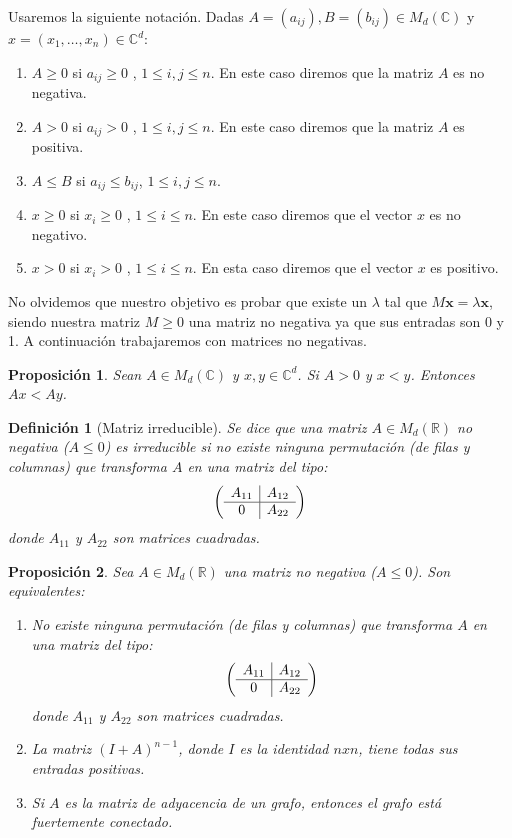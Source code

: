 \documentclass[size=a4, parskip=half, titlepage=false, toc=flat, toc=bib, 12pt]{scrartcl}
\theoremstyle{theorem-style}
\newtheorem{nprop}{Proposición}[section]
\theoremstyle{definition-style}
\newtheorem{ndef}{Definición}[section]
\theoremstyle{remark-style}
\theoremstyle{example-style}
\theoremstyle{definition-style}
\theoremstyle{remark-style}
\begin{document}
Usaremos la siguiente notación. Dadas $A = (a_{ij}),B = (b_{ij}) \in M_d(\mathbb{C})$ y $x = (x_1, \dots, x_n)\in \mathbb{C}^d$:
\begin{enumerate}
\item $A\geq 0$ si $a_{ij}\geq 0$ , $1 \leq i,j \leq n$. En este caso diremos que la matriz $A$ es no negativa.
\item $A > 0$ si $a_{ij} > 0$ , $1 \leq i, j \leq n$. En este caso diremos que la matriz $A$ es positiva.
\item $A \leq B$ si $a_{ij} \leq b_{ij}$, $1 \leq i,j \leq n$.
\item $x \geq 0$ si $x_i \geq 0$ , $1 \leq i \leq n$. En este caso diremos que el vector $x$ es no negativo.
\item $x > 0$ si $x_i > 0$ , $1 \leq i \leq n$. En esta caso diremos que el vector $x$ es positivo.
\end{enumerate}

No olvidemos que nuestro objetivo es probar que existe un $\lambda$ tal que $M\boldsymbol{x} = \lambda \boldsymbol{x}$, siendo nuestra matriz $M \geq 0$ una matriz no negativa ya que sus entradas son 0 y 1. A continuación trabajaremos con matrices no negativas.
\begin{nprop}
Sean $A \in M_d(\mathbb{C})$ y $x,y \in \mathbb{C}^d$. Si $A > 0$ y $x < y$. Entonces $Ax < Ay$.
\end{nprop}

\begin{ndef}[Matriz irreducible]
Se dice que una matriz $A \in M_d(\mathbb{R})$ no negativa ($A \leq 0$) es irreducible si no existe ninguna permutación (de filas y columnas) que transforma $A$ en una matriz del tipo:
$$\left(
      \begin{array}{{c|c}}
            A_{11}    &    A_{12}  \\\hline
            0         &    A_{22}     \\
      \end{array}   \right)$$
donde $A_{11}$ y $A_{22}$ son matrices cuadradas.
\end{ndef}
\begin{nprop} Sea $A \in M_d(\mathbb{R})$ una matriz no negativa ($A \leq 0$). Son equivalentes:
\begin{enumerate}
\item No existe ninguna permutación (de filas y columnas) que transforma $A$ en una matriz del tipo:
$$\left(
      \begin{array}{{c|c}}
            A_{11}    &    A_{12}  \\\hline
            0         &    A_{22}     \\
      \end{array}   \right)$$
donde $A_{11}$ y $A_{22}$ son matrices cuadradas.
\item La matriz $(I + A)^{n - 1}$, donde $I$ es la identidad $n x n$, tiene todas sus entradas positivas.
\item Si $A$ es la matriz de adyacencia de un grafo, entonces el grafo está fuertemente conectado.
\end{enumerate}
\end{nprop}
\end{document}
